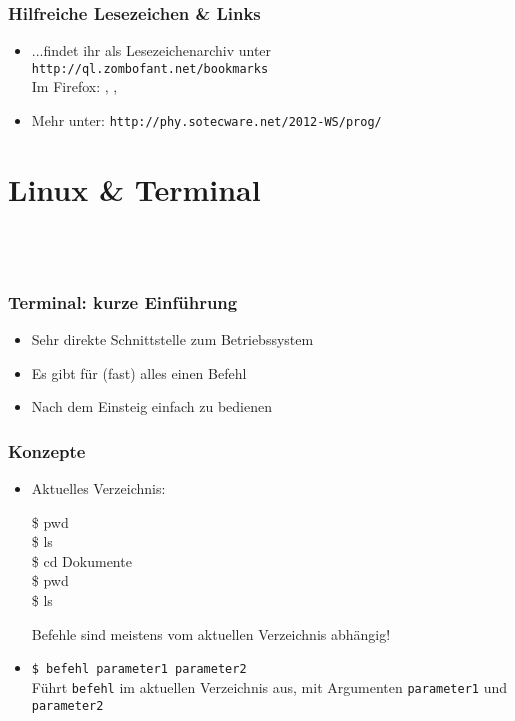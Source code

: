     \begin{frame}
        \frametitle{Hilfreiche Lesezeichen \& Links}
        \begin{itemize}
            \item ...findet ihr als Lesezeichenarchiv unter \\
                \texttt{http://ql.zombofant.net/bookmarks} \\
                Im Firefox: ,
                , 
            \pause
            \item Mehr unter: \texttt{http://phy.sotecware.net/2012-WS/prog/}
        \end{itemize}
    \end{frame}

    \section{Linux \& Terminal}\subsection{~}

    \begin{frame}
        \frametitle{Terminal: kurze Einführung}
        \begin{itemize}
            \item Sehr direkte Schnittstelle zum Betriebssystem
            \item Es gibt für (fast) alles einen Befehl
            \item Nach dem Einsteig einfach zu bedienen
        \end{itemize}
    \end{frame}

    \begin{frame}
        \frametitle{Konzepte}
        \begin{itemize}
            \item Aktuelles Verzeichnis: \\
                \begin{tryit}
                    \$ pwd \\
                    \$ ls \\
                    \$ cd Dokumente \\
                    \$ pwd \\
                    \$ ls \\
                \end{tryit}
                \pause
                Befehle sind meistens vom aktuellen Verzeichnis abhängig!
            \pause
            \item \texttt{\$ befehl parameter1 parameter2} \\
                Führt \texttt{befehl} im aktuellen Verzeichnis aus, mit
                Argumenten \texttt{parameter1} und \texttt{parameter2}
        \end{itemize}
    \end{frame}

